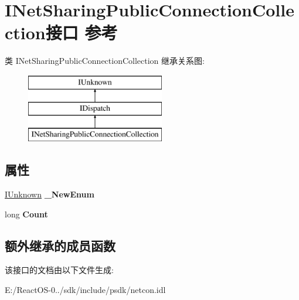\hypertarget{interface_i_net_sharing_public_connection_collection}{}\section{I\+Net\+Sharing\+Public\+Connection\+Collection接口 参考}
\label{interface_i_net_sharing_public_connection_collection}
类 I\+Net\+Sharing\+Public\+Connection\+Collection 继承关系图\+:\begin{figure}[H]
\begin{center}
\leavevmode
\includegraphics[height=3.000000cm]{interface_i_net_sharing_public_connection_collection}
\end{center}
\end{figure}
\subsection*{属性}
\begin{DoxyCompactItemize}
\item 
\mbox{\label{interface_i_net_sharing_public_connection_collection_a8f82db5d4fc123e2769ccf5ac900dc2f}} 
\hyperlink{interface_i_unknown}{I\+Unknown} {\bfseries \+\_\+\+New\+Enum}
\item 
\mbox{\label{interface_i_net_sharing_public_connection_collection_ad4eb7bbcd2fb2a8bda2ce175e03d168f}} 
long {\bfseries Count}
\end{DoxyCompactItemize}
\subsection*{额外继承的成员函数}


该接口的文档由以下文件生成\+:\begin{DoxyCompactItemize}
\item 
E\+:/\+React\+O\+S-\/0../sdk/include/psdk/netcon.\+idl\end{DoxyCompactItemize}
